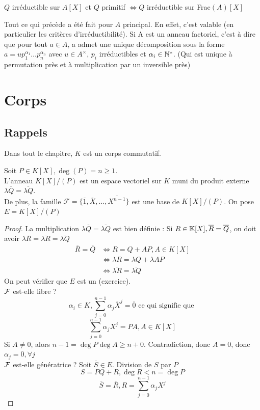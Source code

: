 \documentclass[]{report}
\begin{document}
    \begin{re}{}{}
        $Q$ irréductible sur $A[X]$ et $Q$ primitif $\iff Q$ irréductible sur Frac$(A)[X]$
    \end{re}

    \begin{re}{}{}
        Tout ce qui précède a été fait pour $A$ principal. En effet, c'est valable (en particulier les critères d'irréductibilité). Si A est un anneau factoriel, c'est à dire que pour tout $a\in A$, a admet une unique décomposition sous la forme $a=up_1^{\alpha_1}\dots p_n^{\alpha_n}$ avec $u\in A^\times$, $p_i$ irréductibles et $\alpha_i\in\mathbb{N}^*$. (Qui est unique à permutation près et à multiplication par un inversible près)
    \end{re}

    \chapter{Corps}

    \section{Rappels}

    Dans tout le chapitre, $K$ est un corps commutatif.

    \begin{tm}{}{}
        Soit $P\in K[X],\deg(P)=n\ge1$. \\
        L'anneau $K[X]/(P)$ est un espace vectoriel sur $K$ muni du produit externe $\lambda \overline{Q}=\overline{\lambda Q}$.\\
        De plus, la famille $ \mathcal{F}=\{\overline{1},\overline{X},\dots,\overline{X^{n-1}}\}$ est une base de $K[X]/(P)$. On pose $E=K[X]/(P)$
    \end{tm}

    \begin{proof}
        La multiplication $\lambda \overline{Q}=\overline{\lambda Q}$ est bien définie : Si $R\in\mathbb{K}[X],\overline{R}=\overline{Q}$, on doit avoir $\lambda \overline{R}=\overline{\lambda R}=\overline{\lambda Q}$
        \begin{align*}
            \overline{R}=\overline{Q}&\iff R=Q+AP,A\in K[X]\\
            &\iff \lambda R=\lambda Q+\lambda AP\\
            &\iff \overline{\lambda R}=\overline{\lambda Q}
        \end{align*}
        On peut vérifier que $E$ est un \ev (exercice).\\
        $\mathcal{F}$ est-elle libre ?
        \[\alpha_i\in K,\sum_{j=0}^{n-1}\alpha_j \overline{X}^j=\overline{0}\text{ ce qui signifie que }\]
        \[\sum_{j=0}^{n-1}\alpha_j X^j=PA,A\in K[X]\]
        Si $A\neq 0$, alors $n-1=\deg P\deg A\ge n+0$. Contradiction, donc $A=0$, donc $\alpha_j=0,\forall j$\\
        $\mathcal{F}$ est-elle génératrice ? Soit $\overline{S}\in E$. Division de $S$ par $P$
        \[S=PQ+R,\deg R<n=\deg P\]
        \[\overline{S}=\overline{R}, R=\sum_{j=0}^{n-1}\alpha_j X^j\]
    \end{proof}
\end{document}
